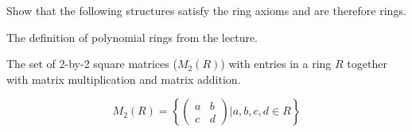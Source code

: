 \begin{aufgabe}[Rings]
Show that the following structures satisfy the ring axioms and are therefore rings.

\begin{teilaufgabe}
\item The definition of polynomial rings from the lecture.
    
\end{teilaufgabe}

\begin{teilaufgabe}
\item The set of 2-by-2 square matrices ($M_2(R)$) with entries in a ring $R$ together with matrix multiplication and matrix addition.

\[
M_2(R) = \left\{ \begin{pmatrix}a & b \\ c & d\end{pmatrix} \Big| a,b,c,d \in R \right\}
\]
\end{teilaufgabe}
\end{aufgabe}



